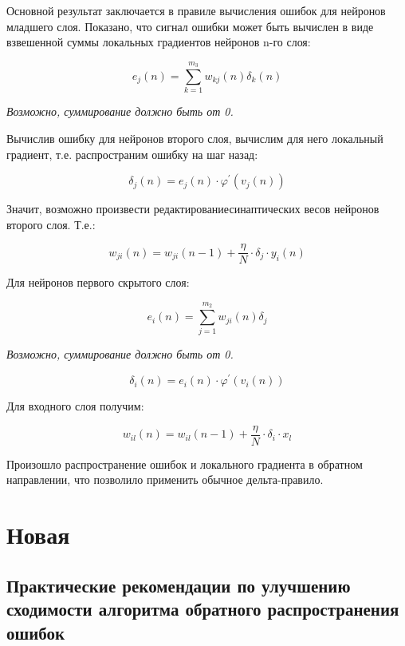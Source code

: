 \documentclass{article}
\numberwithin{equation}{subsection}
\begin{document}
Основной результат заключается в правиле вычисления ошибок для нейронов младшего слоя. 
Показано, что сигнал ошибки может быть вычислен в виде взвешенной суммы локальных градиентов
нейронов n-го слоя:

\begin{equation}
    e_j(n) = \sum_{k=1}^{m_3} w_{kj}(n) \delta_k (n)
\end{equation}

\begin{myquote}
    \textit{Возможно, суммирование должно быть от 0.}
\end{myquote}

Вычислив ошибку для нейронов второго слоя, вычислим для него локальный градиент, т.е. 
распространим ошибку на шаг назад:

\begin{equation}
    \delta_j(n) = e_j(n) \cdot \varphi^{\prime} (v_j(n))
\end{equation}

Значит, возможно произвести \glqq редактирование\grqq синаптических весов нейронов второго слоя. Т.е.:

\begin{equation}
    w_{ji}(n) = w_{ji}(n-1) + \dfrac{\eta}{N} \cdot \delta_j \cdot y_i(n)
\end{equation}

Для нейронов первого скрытого слоя:

\begin{equation}
    e_i(n) = \sum_{j=1}^{m_2} w_{ji}(n) \delta_j
\end{equation}

\begin{myquote}
    \textit{Возможно, суммирование должно быть от 0.}
\end{myquote}

\begin{equation}
    \delta_i(n) = e_i(n) \cdot \varphi^{\prime} (v_i(n))
\end{equation}

Для входного слоя получим:

\begin{equation}
    w_{il}(n) = w_{il}(n-1) + \dfrac{\eta}{N} \cdot \delta_i \cdot x_l
\end{equation}

Произошло распространение ошибок и локального градиента в обратном направлении, что
позволило применить обычное дельта-правило.



\section{Новая}
\subsection{Практические рекомендации по улучшению сходимости алгоритма обратного распространения ошибок}
\end{document}

